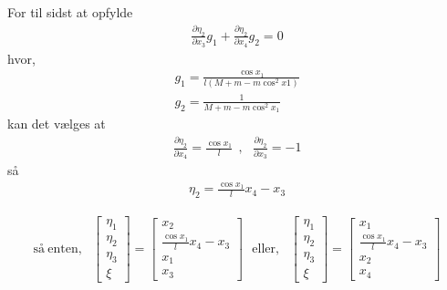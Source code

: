 For til sidst at opfylde
\begin{align}
 \frac{\partial \eta_2}{\partial x_3} g_1 + \frac{\partial \eta_2}{\partial x_4} g_2 = 0
\end{align}
hvor,
\begin{align}
  g_1 = \frac{\cos x_1}{l (M + m - m \cos^2 x1)}\\
  g_2 = \frac{1}{M + m - m \cos^2 x_1 }
\end{align}
kan det vælges at
\begin{align}
\frac{\partial \eta_2}{\partial x_4} = \frac{\cos x_1}{l}  \ \ , \ \ \ \frac{\partial \eta_2}{\partial x_3}  = -1
\end{align}
så
\begin{align}
\eta_2 =  \frac{\cos x_1}{l} x_4 - x_3
\end{align}

\begin{align}
\mathrm{så\ enten,} \ \ \ 
\begin{bmatrix}
\eta_1   \\
\eta_2   \\
\eta_3   \\
\xi
\end{bmatrix}
=
\begin{bmatrix}
x_2   \\
\frac{\cos x_1}{l} x_4 - x_3  \\
x_1   \\
x_3
\end{bmatrix} \ \ \ \mathrm{eller,} \ \ \
\begin{bmatrix}
\eta_1   \\
\eta_2   \\
\eta_3   \\
\xi
\end{bmatrix}
=
\begin{bmatrix}
x_1   \\
\frac{\cos x_1}{l} x_4 - x_3   \\
x_2   \\
x_4
\end{bmatrix}
\end{align}




